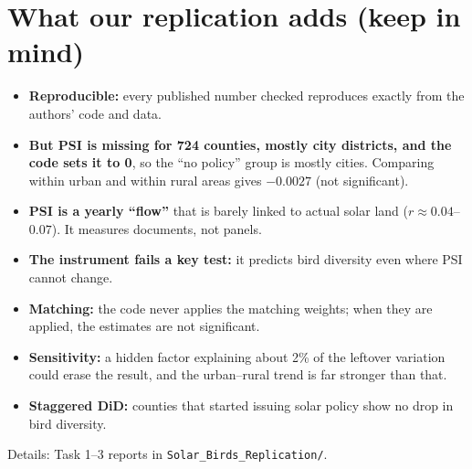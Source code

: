 \documentclass[11pt]{article}
\begin{document}
\section{What our replication adds (keep in mind)}
\begin{whybox}\small
\begin{itemize}[leftmargin=12pt]
\item \textbf{Reproducible:} every published number checked reproduces exactly from the authors' code and data.
\item \textbf{But PSI is missing for 724 counties, mostly city districts, and the code sets it to 0}, so the ``no policy'' group is mostly cities. Comparing within urban and within rural areas gives $-0.0027$ (not significant).
\item \textbf{PSI is a yearly ``flow''} that is barely linked to actual solar land ($r\approx0.04$--$0.07$). It measures documents, not panels.
\item \textbf{The instrument fails a key test:} it predicts bird diversity even where PSI cannot change.
\item \textbf{Matching:} the code never applies the matching weights; when they are applied, the estimates are not significant.
\item \textbf{Sensitivity:} a hidden factor explaining about 2\% of the leftover variation could erase the result, and the urban--rural trend is far stronger than that.
\item \textbf{Staggered DiD:} counties that started issuing solar policy show no drop in bird diversity.
\end{itemize}
Details: Task 1--3 reports in \texttt{Solar\_Birds\_Replication/}.
\end{whybox}
\end{document}
